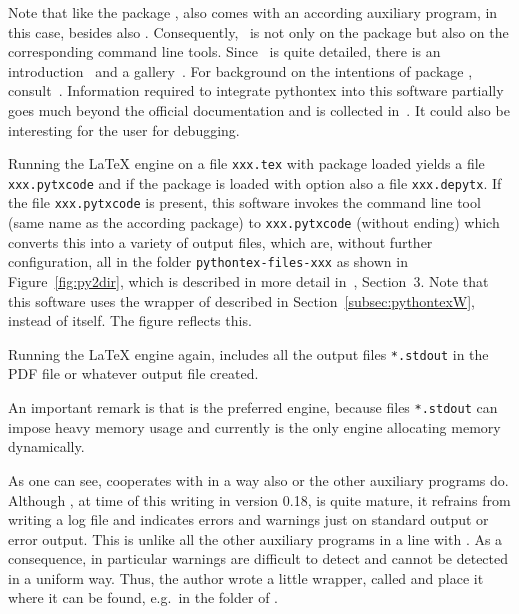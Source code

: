 Note that like the package , also  
comes with an according auxiliary program, 
in this case, besides  also . 
Consequently,~\cite{PythonTexP} is not only on the package 
but also on the corresponding command line tools. 
Since~\cite{PythonTexP} is quite detailed, 
there is an introduction~\cite{PythonTexQ} and a gallery~\cite{PythonTexG}. 
For background on the intentions of package , consult~\cite{PythonTexRepr}. 
Information required to integrate pythontex into this software 
partially goes much beyond the official documentation and is collected in~\cite{PyTexInOut}. 
It could also be interesting for the user for debugging. 

Running the \LaTeX{} engine on a file \texttt{xxx.tex} 
with package  loaded 
yields a file \texttt{xxx.pytxcode} 
and if the package is loaded with option  
also a file \texttt{xxx.depytx}.
If the file \texttt{xxx.pytxcode} is present, 
this software invokes the command line tool  
(same name as the according package) 
to \texttt{xxx.pytxcode} (without ending) 
which converts this into a variety of output files, 
which are, without further configuration, 
all in the folder \texttt{pythontex-files-xxx}
as shown in Figure~\ref{fig:py2dir}, 
which is described in more detail in~\cite{PyTexInOut}, Section~3. 
Note that this software uses the wrapper  
of  described in Section~\ref{subsec:pythontexW}, 
instead of  itself. 
The figure reflects this. 


Running the \LaTeX{} engine again, 
includes all the output files \texttt{*.stdout} 
in the PDF file or whatever output file created. 


An important remark is that \lualatex{} is the preferred engine, 
because files \texttt{*.stdout} can impose heavy memory usage 
and currently \lualatex{} is the only engine allocating memory dynamically. 

As one can see,  cooperates with \lualatex{} in a way 
also  or the other auxiliary programs do. 
Although , at time of this writing in version 0.18, 
is quite mature, it refrains from writing a log file and indicates errors and warnings 
just on standard output or error output. 
This is unlike all the other auxiliary programs in a line with . 
As a consequence, in particular warnings are difficult to detect 
and cannot be detected in a uniform way. 
Thus, the author wrote a little wrapper, called  
and place it where it can be found, e.g.~in the folder of . 

